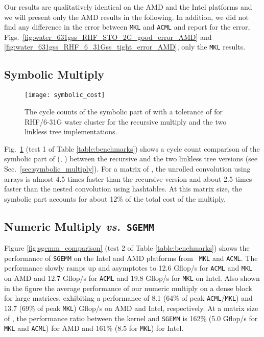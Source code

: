 Our results are qualitatively identical on the AMD and the Intel platforms and
we will present only the AMD results in the following. In addition, we did not
find any difference in the error between {\tt MKL} and {\tt ACML} and report
for the error, Figs.~\ref{fig:water_631gss_RHF_STO_2G_good_error_AMD} and
\ref{fig:water_631gss_RHF_6_31Gss_tight_error_AMD}, only the {\tt MKL}
results.

\subsection{Symbolic Multiply}

\begin{figure}
\texttt{[image: symbolic\_cost]}
\caption{\label{fig:symbolic_cost} The cycle counts of the symbolic part of
\SpAMM{} with a tolerance of  for RHF/6-31G
water cluster for the recursive multiply and the two linkless tree
implementations.}
\end{figure}

Fig.~\ref{fig:symbolic_cost} (test 1 of Table \ref{table:benchmarks}) shows a
cycle count comparison of the symbolic part of \SpAMM{}(, ) between the recursive and the two linkless tree versions
(see Sec.~\ref{sec:symbolic_multiply}). For a matrix of , the
unrolled convolution using arrays is almost 4.5 times faster than the
recursive version and about 2.5 times faster than the nested convolution using
hashtables. At this matrix size, the symbolic part accounts for about 12\% of
the total cost of the multiply.

\subsection{Numeric Multiply \emph{vs.}~{\tt SGEMM}}

Figure \ref{fig:sgemm_comparison} (test 2 of Table \ref{table:benchmarks})
shows the performance of {\tt SGEMM} on the Intel and AMD platforms from {\tt
MKL} and {\tt ACML}. The performance slowly ramps up and asymptotes to 12.6
Gflop/s for {\tt ACML} and {\tt MKL} on AMD and 12.7 Gflop/s for {\tt ACML}
and 19.8 Gflop/s for {\tt MKL} on Intel.  Also shown in the figure the average
performance of our numeric multiply on a dense  block for large
matrices, exhibiting a performance of 8.1 (64\% of peak {\tt ACML}/{\tt MKL})
and 13.7 (69\% of peak {\tt MKL}) Gflop/s on AMD and Intel, respectively. At a
matrix size of , the performance ratio between the \SpAMM{}
kernel and {\tt SGEMM} is 162\% (5.0 Gflop/s for {\tt MKL} and {\tt ACML}) for
AMD and 161\% (8.5 for {\tt MKL}) for Intel.

